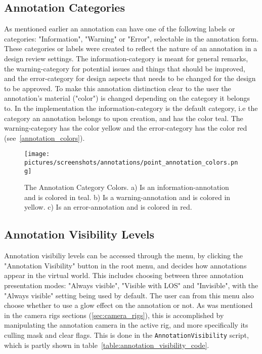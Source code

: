 \subsection{Annotation Categories}
As mentioned earlier an annotation can have one of the following labels or categories: "Information", "Warning" or "Error", selectable in the annotation form.
These categories or labels were created to reflect the nature of an annotation in a design review settings. 
The information-category is meant for general remarks, the warning-category for potential issues and things that should be improved, and the
error-category for design aspects that needs to be changed for the design to be approved. To make this annotation distinction clear to the user
the annotation's material ("color") is changed depending on the category it belongs to. In the implementation the information-category is
the default category, i.e the category an annotation belongs to upon creation, and has the color teal. The warning-category has the color yellow and
the error-category has the color red (see~\vref{annotation_colors}).

\begin{figure}%
	\texttt{[image: pictures/screenshots/annotations/point\_annotation\_colors.png]}
	\caption[The Annotation Category Colors]{The Annotation Category Colors. a) Is an information-annotation and is colored in teal. 
			b) Is a warning-annotation and is colored in yellow. c) Is an error-annotation and is colored in red.}
	\label{fig:annotation_colors}
\end{figure} 

\subsection{Annotation Visibility Levels}
\label{sec:annotations}
Annotation visibiliy levels can be accessed through the menu, by clicking the "Annotation Visibility" button in the root menu, 
and decides how annotations appear in the virtual world. This includes choosing between three annotation presentation modes: "Always visible", "Visible with LOS" and 
"Invisible", with the "Always visible" setting being used by default. 
The user can from this menu also choose whether to use a glow effect on the annotation or not. 
As was mentioned in the camera rigs sections (\ref{sec:camera_rigs}), this is 
accomplished by manipulating the annotation camera in the active rig, and more specifically its culling mask and clear flags. 
This is done in the \texttt{AnnotationVisibility} script, which is partly shown in table~\vref{table:annotation_visibility_code}.


